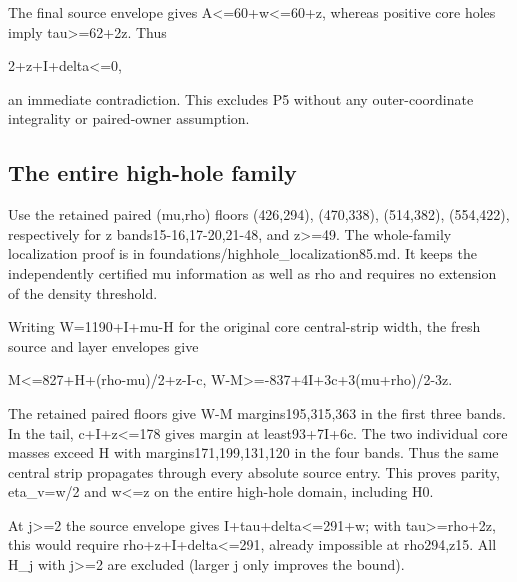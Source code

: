 \documentclass[10pt,a4paper]{article}
\theoremstyle{definition}
\begin{document}
The final source envelope gives A\textless=\allowbreak{}60+\allowbreak{}w\textless=\allowbreak{}60+\allowbreak{}z,\allowbreak{} whereas
positive core holes imply tau\textgreater=\allowbreak{}62+\allowbreak{}2z. Thus

2+\allowbreak{}z+\allowbreak{}I+\allowbreak{}delta\textless=\allowbreak{}0,\allowbreak{}

an immediate contradiction. This excludes P5 without any
outer-coordinate integrality or paired-owner assumption.

\hypertarget{the-entire-high-hole-family}{%
\subsection{The entire high-hole
family}\label{the-entire-high-hole-family}}

Use the retained paired (mu,\allowbreak{}rho) floors (426,\allowbreak{}294),\allowbreak{} (470,\allowbreak{}338),\allowbreak{} (514,\allowbreak{}382),\allowbreak{}
(554,\allowbreak{}422),\allowbreak{} respectively for z bands15-16,\allowbreak{}17-20,\allowbreak{}21-48,\allowbreak{} and
z\textgreater=\allowbreak{}49. The whole-family localization proof is in
foundations/highhole\_\allowbreak{}localization85.md. It keeps the independently
certified mu information as well as rho and requires no extension of the
density threshold.

Writing W=\allowbreak{}1190+\allowbreak{}I+\allowbreak{}mu-H for the original core central-strip width,\allowbreak{} the
fresh source and layer envelopes give

M\textless=\allowbreak{}827+\allowbreak{}H+\allowbreak{}(rho-mu)/2+\allowbreak{}z-I-c,\allowbreak{}
W-M\textgreater=\allowbreak{}-837+\allowbreak{}4I+\allowbreak{}3c+\allowbreak{}3(mu+\allowbreak{}rho)/2-3z.

The retained paired floors give W-M margins195,\allowbreak{}315,\allowbreak{}363 in the first
three bands. In the tail,\allowbreak{} c+\allowbreak{}I+\allowbreak{}z\textless=\allowbreak{}178 gives margin at
least93+\allowbreak{}7I+\allowbreak{}6c. The two individual core masses exceed H with
margins171,\allowbreak{}199,\allowbreak{}131,\allowbreak{}120 in the four bands. Thus the same central strip
propagates through every absolute source entry. This proves parity,\allowbreak{}
eta\_\allowbreak{}v=\allowbreak{}w/2 and w\textless=\allowbreak{}z on the entire high-hole domain,\allowbreak{} including
H0.

At j\textgreater=\allowbreak{}2 the source envelope gives I+\allowbreak{}tau+\allowbreak{}delta\textless=\allowbreak{}291+\allowbreak{}w;
with tau\textgreater=\allowbreak{}rho+\allowbreak{}2z,\allowbreak{} this would require
rho+\allowbreak{}z+\allowbreak{}I+\allowbreak{}delta\textless=\allowbreak{}291,\allowbreak{} already impossible at rho294,\allowbreak{}z15. All H\_\allowbreak{}j
with j\textgreater=\allowbreak{}2 are excluded (larger j only improves the bound).
\end{document}
